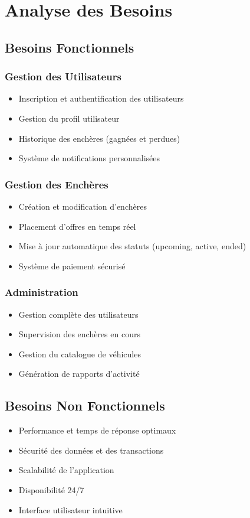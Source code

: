 \chapter{Analyse des Besoins}

\section{Besoins Fonctionnels}
\subsection{Gestion des Utilisateurs}
\begin{itemize}
    \item Inscription et authentification des utilisateurs
    \item Gestion du profil utilisateur
    \item Historique des enchères (gagnées et perdues)
    \item Système de notifications personnalisées
\end{itemize}

\subsection{Gestion des Enchères}
\begin{itemize}
    \item Création et modification d'enchères
    \item Placement d'offres en temps réel
    \item Mise à jour automatique des statuts (upcoming, active, ended)
    \item Système de paiement sécurisé
\end{itemize}

\subsection{Administration}
\begin{itemize}
    \item Gestion complète des utilisateurs
    \item Supervision des enchères en cours
    \item Gestion du catalogue de véhicules
    \item Génération de rapports d'activité
\end{itemize}

\section{Besoins Non Fonctionnels}
\begin{itemize}
    \item Performance et temps de réponse optimaux
    \item Sécurité des données et des transactions
    \item Scalabilité de l'application
    \item Disponibilité 24/7
    \item Interface utilisateur intuitive
\end{itemize}

